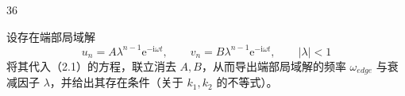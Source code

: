 \begin{problem}[2026年博知汇BWPhO][拓扑绝缘体]{36}
\begin{subproblem}
        \begin{subsubproblem}
            设存在端部局域解
            \begin{equation}
                u _ {n} = A \lambda^ {n - 1} \mathrm{e} ^ {- \mathrm{i} \omega t}, \qquad v _ {n} = B \lambda^ {n - 1} \mathrm{e} ^ {- \mathrm{i} \omega t}, \qquad | \lambda | <   1
            \end{equation}
            将其代入（2.1）的方程，联立消去 $A, B$，从而导出端部局域解的频率 $\omega_{edge}$ 与衰减因子 $\lambda$，并给出其存在条件（关于 $k_{1}, k_{2}$ 的不等式）。
        \end{subsubproblem}
    \end{subproblem}
\end{problem}
